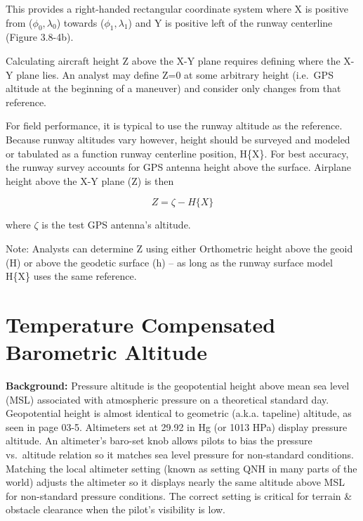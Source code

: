 \documentclass[
]{book}
\begin{document}
This provides a right-handed rectangular coordinate system where X is positive from (\(\phi_0, \lambda_0\)) towards (\(\phi_1, \lambda_1\)) and Y is positive left of the runway centerline (Figure 3.8-4b).

Calculating aircraft height Z above the X-Y plane requires defining where the X-Y plane lies. An analyst may define Z=0 at some arbitrary height (i.e.~GPS altitude at the beginning of a maneuver) and consider only changes from that reference.

For field performance, it is typical to use the runway altitude as the reference. Because runway altitudes vary however, height should be surveyed and modeled or tabulated as a function runway centerline position, H\{X\}. For best accuracy, the runway survey accounts for GPS antenna height above the surface. Airplane height above the X-Y plane (Z) is then

\[Z = \zeta - H\{X\}\]

where \(\zeta\) is the test GPS antenna's altitude.

Note: Analysts can determine Z using either Orthometric height above the geoid (H) or above the geodetic surface (h) -- as long as the runway surface model H\{X\} uses the same reference.

\hypertarget{temperature-compensated-barometric-altitude}{%
\section{Temperature Compensated Barometric Altitude}\label{temperature-compensated-barometric-altitude}}

\textbf{Background:} Pressure altitude is the geopotential height above mean sea level (MSL) associated with atmospheric pressure on a theoretical standard day. Geopotential height is almost identical to geometric (a.k.a. tapeline) altitude, as seen in page 03-5. Altimeters set at 29.92 in Hg (or 1013 HPa) display pressure altitude. An altimeter's baro-set knob allows pilots to bias the pressure vs.~altitude relation so it matches sea level pressure for non-standard conditions. Matching the local altimeter setting (known as setting QNH in many parts of the world) adjusts the altimeter so it displays nearly the same altitude above MSL for non-standard pressure conditions. The correct setting is critical for terrain \& obstacle clearance when the pilot's visibility is low.
\end{document}
